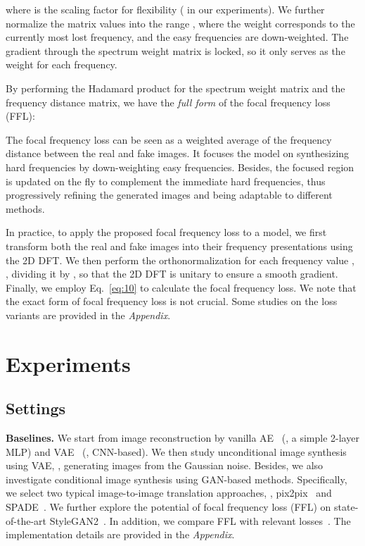 \documentclass[10pt,twocolumn,letterpaper]{article}
\begin{document}
where  is the scaling factor for flexibility ( in our experiments). We further normalize the matrix values into the range , where the weight  corresponds to the currently most lost frequency, and the easy frequencies are down-weighted. The gradient through the spectrum weight matrix is locked, so it only serves as the weight for each frequency.

By performing the Hadamard product for the spectrum weight matrix and the frequency distance matrix, we have the \textit{full form} of the focal frequency loss (FFL):

The focal frequency loss can be seen as a weighted average of the frequency distance between the real and fake images.
It focuses the model on synthesizing hard frequencies by down-weighting easy frequencies. Besides, the focused region is updated on the fly to complement the immediate hard frequencies, thus progressively refining the generated images and being adaptable to different methods.

In practice, to apply the proposed focal frequency loss to a model, we first transform both the real and fake images into their frequency presentations using the 2D DFT.
We then perform the orthonormalization for each frequency value , \ie, dividing it by , so that the 2D DFT is unitary to ensure a smooth gradient.
Finally, we employ Eq.~\eqref{eq:10} to calculate the focal frequency loss.
We note that the exact form of focal frequency loss is not crucial.
Some studies on the loss variants are provided in the \textit{Appendix}.









%
 

\section{Experiments}
\label{sec:experiments}





\subsection{Settings}
\label{sec:settings}
\noindent
\textbf{Baselines.}
We start from image reconstruction by vanilla AE~\cite{ae} (\ie, a simple 2-layer MLP) and VAE~\cite{vae} (\ie, CNN-based).
We then study unconditional image synthesis using VAE, \ie, generating images from the Gaussian noise.
Besides, we also investigate conditional image synthesis using GAN-based methods. Specifically, we select two typical image-to-image translation approaches, \ie, pix2pix~\cite{pix2pix} and SPADE~\cite{SPADE}.
We further explore the potential of focal frequency loss (FFL) on state-of-the-art StyleGAN2~\cite{stylegan2}.
In addition, we compare FFL with relevant losses~\cite{perceptualloss,specreg}.
The implementation details are provided in the \textit{Appendix}.
\end{document}
